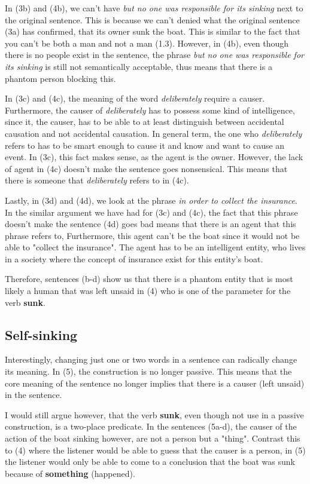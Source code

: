 \documentclass{article}
\begin{document}
In (3b) and (4b), we can't have \textit{but no one was responsible for its sinking} next to the original sentence. This is because we can't denied what the original sentence (3a) has confirmed, that its owner sunk the boat. This is similar to the fact that you can't be both a man and not a man (1.3). However, in (4b), even though there is no people exist in the sentence, the phrase \textit{but no one was responsible for its sinking} is still not semantically acceptable, thus means that there is a phantom person blocking this.


In (3c) and (4c), the meaning of the word \textit{deliberately} require a causer. Furthermore, the causer of \textit{deliberately} has to possess some kind of intelligence, since it, the causer, has to be able to at least distinguish between accidental causation and not accidental causation. In general term, the one who \textit{deliberately} refers to has to be smart enough to cause it and know and want to cause an event. In (3c), this fact makes sense, as the agent is the owner. However, the lack of agent in (4c) doesn't make the sentence goes nonsensical. This means that there is someone that \textit{deliberately} refers to in (4c). 

Lastly, in (3d) and (4d), we look at the phrase \textit{in order to collect the insurance}. In the similar argument we have had for (3c) and (4c), the fact that this phrase doesn't make the sentence (4d) goes bad means that there is an agent that this phrase refers to, Furthermore, this agent can't be the boat since it would not be able to "collect the insurance". The agent has to be an intelligent entity, who lives in a society where the concept of insurance exist for this entity's boat. 

Therefore, sentences (b-d) show us that there is a phantom entity that is most likely a human that was left unsaid in (4) who is one of the parameter for the verb \textbf{sunk}. 

\subsection{Self-sinking}
Interestingly, changing just one or two words in a sentence can radically change its meaning. In (5), the construction is no longer passive. This means that the core meaning of the sentence no longer implies that there is a causer (left unsaid) in the sentence. 

I would still argue however, that the verb \textbf{sunk}, even though not use in a passive construction, is a two-place predicate. In the sentences (5a-d), the causer of the action of the boat sinking however, are not a person but a "thing". Contrast this to (4) where the listener would be able to guess that the causer is a person, in (5) the listener would only be able to come to a conclusion that the boat was sunk because of \textbf{something} (happened). 
\end{document}
